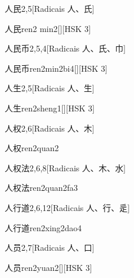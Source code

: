 \begin{entry}{人民}{2,5}[Radicais ⼈、⽒]
  \begin{phonetics}{人民}{ren2 min2}[][HSK 3]
  \end{phonetics}
\end{entry}

\begin{entry}{人民币}{2,5,4}[Radicais ⼈、⽒、⼱]
  \begin{phonetics}{人民币}{ren2min2bi4}[][HSK 3]
  \end{phonetics}
\end{entry}

\begin{entry}{人生}{2,5}[Radicais ⼈、⽣]
  \begin{phonetics}{人生}{ren2sheng1}[][HSK 3]
  \end{phonetics}
\end{entry}

\begin{entry}{人权}{2,6}[Radicais ⼈、⽊]
  \begin{phonetics}{人权}{ren2quan2}
  \end{phonetics}
\end{entry}

\begin{entry}{人权法}{2,6,8}[Radicais ⼈、⽊、⽔]
  \begin{phonetics}{人权法}{ren2quan2fa3}
  \end{phonetics}
\end{entry}

\begin{entry}{人行道}{2,6,12}[Radicais ⼈、⾏、⾡]
  \begin{phonetics}{人行道}{ren2xing2dao4}
  \end{phonetics}
\end{entry}

\begin{entry}{人员}{2,7}[Radicais ⼈、⼝]
  \begin{phonetics}{人员}{ren2yuan2}[][HSK 3]
  \end{phonetics}
\end{entry}


